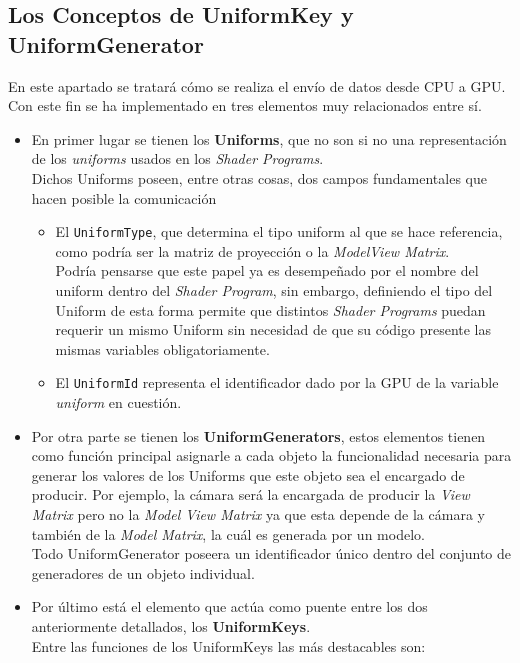 \subsection{Los Conceptos de UniformKey y UniformGenerator}\label{susec:UnifKeyUnifGen}
En este apartado se tratará cómo se realiza el envío de datos desde CPU a GPU.\\
Con este fin se ha implementado en \robotto tres elementos muy relacionados entre sí.\\
\begin{itemize}
\item En primer lugar se tienen los \textbf{Uniforms}, que no son si no una representación de los \textit{uniforms} usados en los \textit{Shader Programs}.\\
Dichos Uniforms poseen, entre otras cosas, dos campos fundamentales que hacen posible la comunicación
\begin{itemize}
\item El \texttt{UniformType}, que determina el tipo uniform al que se hace referencia, como podría ser la matriz de proyección o la \textit{ModelView Matrix}.\\
Podría pensarse que este papel ya es desempeñado por el nombre del uniform dentro del \textit{Shader Program}, sin embargo, definiendo el tipo del Uniform de esta forma permite que distintos \textit{Shader Programs} puedan requerir un mismo Uniform sin necesidad de que su código presente las mismas variables obligatoriamente.
\item El \texttt{UniformId} representa el identificador dado por la GPU de la variable \textit{uniform} en cuestión.
\end{itemize}
\item Por otra parte se tienen los \textbf{UniformGenerators}, estos elementos tienen como función principal asignarle a cada objeto la funcionalidad necesaria para generar los valores de los Uniforms que este objeto sea el encargado de producir. Por ejemplo, la cámara será la encargada de producir la \textit{View Matrix} pero no la \textit{Model View Matrix} ya que esta depende de la cámara y también de la \textit{Model Matrix}, la cuál es generada por un modelo.\\
Todo UniformGenerator poseera un identificador único dentro del conjunto de generadores de un objeto individual.
\item Por último está el elemento que actúa como puente entre los dos anteriormente detallados, los \textbf{UniformKeys}.\\
Entre las funciones de los UniformKeys las más destacables son:

\end{itemize}
